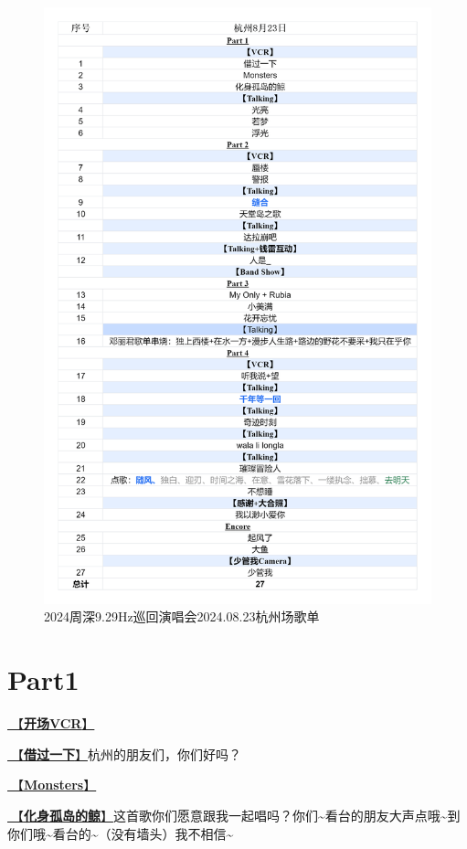 \documentclass[]{ctexbook}
\begin{document}
\begin{figure}

{\centering \includegraphics[width=320pt]{img/playlists/playlists-hangzhou-20240823} 

}

\caption{2024周深9.29Hz巡回演唱会2024.08.23杭州场歌单}\label{fig:unnamed-chunk-68}
\end{figure}

\newpage

\section{Part1}\label{hangzhou-20240823-part1}

\hyperref[opening-vcr]{🎥【\textbf{开场VCR}】}

\hyperref[I-will-go-my-way]{🎵【\textbf{借过一下}】}杭州的朋友们，你们好吗？

\hyperref[Monsters]{🎵【\textbf{Monsters}】}

\hyperref[hua-shen-gu-dao-de-jing]{🎵【\textbf{化身孤岛的鲸}】}这首歌你们愿意跟我一起唱吗？你们\textasciitilde 看台的朋友大声点哦\textasciitilde 到你们哦\textasciitilde 看台的\textasciitilde（没有墙头）我不相信\textasciitilde{}
\end{document}
